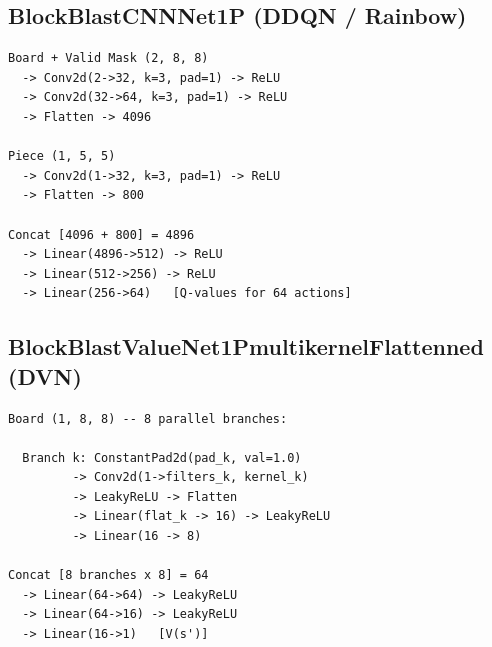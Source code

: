 \documentclass[10pt]{article}
\begin{document}
\subsection{BlockBlastCNNNet1P (DDQN / Rainbow)}

\begin{lstlisting}
Board + Valid Mask (2, 8, 8)
  -> Conv2d(2->32, k=3, pad=1) -> ReLU
  -> Conv2d(32->64, k=3, pad=1) -> ReLU
  -> Flatten -> 4096

Piece (1, 5, 5)
  -> Conv2d(1->32, k=3, pad=1) -> ReLU
  -> Flatten -> 800

Concat [4096 + 800] = 4896
  -> Linear(4896->512) -> ReLU
  -> Linear(512->256) -> ReLU
  -> Linear(256->64)   [Q-values for 64 actions]
\end{lstlisting}

\subsection{BlockBlastValueNet1PmultikernelFlattenned (DVN)}

\begin{lstlisting}
Board (1, 8, 8) -- 8 parallel branches:

  Branch k: ConstantPad2d(pad_k, val=1.0)
         -> Conv2d(1->filters_k, kernel_k)
         -> LeakyReLU -> Flatten
         -> Linear(flat_k -> 16) -> LeakyReLU
         -> Linear(16 -> 8)

Concat [8 branches x 8] = 64
  -> Linear(64->64) -> LeakyReLU
  -> Linear(64->16) -> LeakyReLU
  -> Linear(16->1)   [V(s')]
\end{lstlisting}
\end{document}
